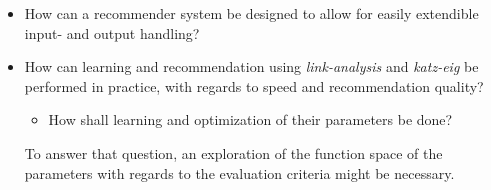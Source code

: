 \begin{itemize}

    \item How can a recommender system be designed to allow for easily extendible input- and output handling?


    \item How can learning and recommendation using \textit{link-analysis} and \textit{katz-eig} be performed in practice, with regards to speed and recommendation quality?

        \begin{itemize}
            \item How shall learning and optimization of their parameters be done?
        \end{itemize}

        To answer that question, an exploration of the function space of the parameters with regards to the evaluation criteria might be necessary.

\end{itemize}

